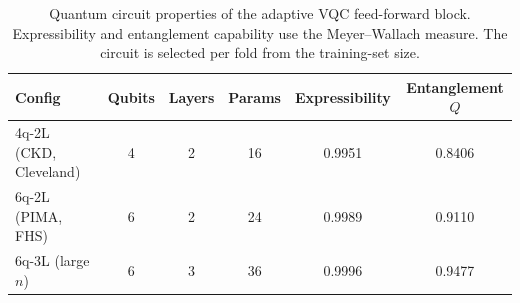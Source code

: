 \begin{table}[!ht]
\centering
\caption{Quantum circuit properties of the adaptive VQC feed-forward block. Expressibility and entanglement capability use the Meyer--Wallach measure. The circuit is selected per fold from the training-set size.}
\label{tab:quantum_circuit}
\begin{tabular}{lccccc}
\toprule
Config & Qubits & Layers & Params & Expressibility & Entanglement $Q$ \\
\midrule
  4q-2L (CKD, Cleveland) & 4 & 2 & 16 & 0.9951 & 0.8406 \\
  6q-2L (PIMA, FHS) & 6 & 2 & 24 & 0.9989 & 0.9110 \\
  6q-3L (large $n$) & 6 & 3 & 36 & 0.9996 & 0.9477 \\
\bottomrule
\end{tabular}
\end{table}
